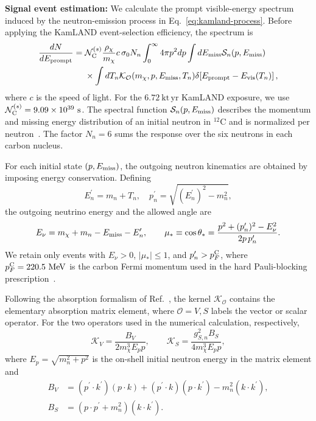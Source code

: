 \documentclass[aps,twocolumn,superscriptaddress,groupedaddress,nofootinbib,floatfix]{revtex4}
\begin{document}
\textbf{Signal event estimation:} We calculate the prompt visible-energy spectrum induced by the
neutron-emission process in Eq.~\eqref{eq:kamland-process}.  Before
applying the KamLAND event-selection efficiency, the spectrum is~\cite{Ge:2024euk}
\begin{align}
\frac{dN}{dE_{\rm prompt}}
={}&
\mathcal N_{\rm C}^{(s)}
\frac{\rho_\chi}{m_\chi}c\,\sigma_0 N_n
\int_0^\infty 4\pi p^2dp
\int dE_{\rm miss}
\mathcal S_n(p,E_{\rm miss})
\nonumber\\
&\times
\int dT_n
\mathcal K_{\mathcal O}
(m_\chi,p,E_{\rm miss},T_n)
\delta\!\left[
E_{\rm prompt}-E_{\rm vis}(T_n)
\right], 
\label{eq:kamland-prompt-rate}
\end{align}
where $c$ is the speed of light. For the $6.72~\mathrm{kt\,yr}$ KamLAND exposure, we use
$\mathcal N_{\rm C}^{(s)}=9.09\times10^{39}~\mathrm{s}$.
The spectral function $\mathcal S_n(p,E_{\rm miss})$ describes the
momentum and missing energy distribution of an initial neutron in
${}^{12}\mathrm C$ and is normalized per neutron~\cite{Benhar:1994hw}.  The factor $N_n=6$
sums the response over the six neutrons in each carbon nucleus.

For each initial state $(p,E_{\rm miss})$, the outgoing neutron
kinematics are obtained by imposing energy conservation.  Defining
\begin{equation}
E_n^\prime=m_n+T_n,
\quad
p_n^\prime=\sqrt{(E_n^\prime)^2-m_n^2},
\end{equation}
the outgoing neutrino energy and the allowed angle are
\begin{equation}
E_\nu=m_\chi+m_n-E_{\rm miss}-E_n^\prime,
\qquad
\mu_\ast\equiv\cos\theta_\ast
=
\frac{p^2+(p_n^\prime)^2-E_\nu^2}
{2p\,p_n^\prime}.
\end{equation}
We retain only events with $E_\nu>0$, $|\mu_\ast|\leq1$, and
$p_n^\prime>p_F^{\rm C}$, where
$p_F^{\rm C}=220.5~\mathrm{MeV}$ is the carbon Fermi momentum used in
the hard Pauli-blocking prescription~\cite{Gong:2025ves}.

Following the absorption formalism of Ref.~\cite{Ge:2024euk}, the kernel
$\mathcal K_{\mathcal O}$ contains the elementary absorption matrix
element, where $\mathcal O=V,S$ labels the vector or scalar operator.
For the two operators used in the numerical calculation, respectively,
\begin{equation}
\mathcal K_V=
\frac{B_V}{2m_\chi^3E_p p},
\qquad
\mathcal K_S=
\frac{g_{S,n}^2 B_S}{4m_\chi^3E_p p},
\end{equation}
where $E_p=\sqrt{m_n^2+p^2}$ is the on-shell initial neutron energy in
the matrix element and
\begin{align}
B_V &=
(p^\prime\!\cdot k^\prime)(p\!\cdot k)
+(p^\prime\!\cdot k)(p\!\cdot k^\prime)
-m_n^2(k\!\cdot k^\prime),
\\
B_S &=
(p\!\cdot p^\prime+m_n^2)(k\!\cdot k^\prime).
\end{align}
\end{document}
